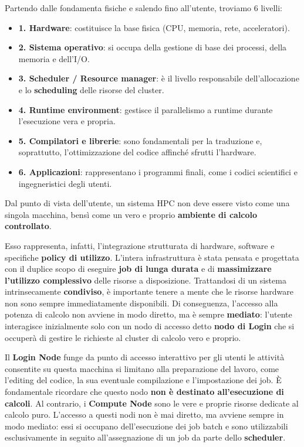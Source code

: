 Partendo dalle fondamenta fisiche e salendo fino all'utente, troviamo 6 livelli:
\begin{itemize}
    \item \textbf{1. Hardware}: costituisce la base fisica (CPU, memoria, rete, acceleratori).
    \item \textbf{2. Sistema operativo}: si occupa della gestione di base dei processi, della memoria e dell'I/O.
    \item \textbf{3. Scheduler / Resource manager}: è il livello responsabile dell'allocazione e lo \textbf{scheduling} delle risorse del cluster.
    \item \textbf{4. Runtime environment}: gestisce il parallelismo a runtime durante l'esecuzione vera e propria.
    \item \textbf{5. Compilatori e librerie}: sono fondamentali per la traduzione e, soprattutto, l'ottimizzazione del codice affinché sfrutti l'hardware.
    \item \textbf{6. Applicazioni}: rappresentano i programmi finali, come i codici scientifici e ingegneristici degli utenti.
\end{itemize}

Dal punto di vista dell'utente, un sistema HPC non deve essere visto come una singola macchina, bensì come un vero e proprio \textbf{ambiente di calcolo controllato}.

Esso rappresenta, infatti, l'integrazione strutturata di hardware, software e specifiche \textbf{policy di utilizzo}. L'intera infrastruttura è stata pensata e progettata con il duplice scopo di eseguire \textbf{job di lunga durata} e di \textbf{massimizzare l'utilizzo complessivo} delle risorse a disposizione. 
Trattandosi di un sistema intrinsecamente \textbf{condiviso}, è importante tenere a mente che le risorse hardware non sono sempre immediatamente disponibili. Di conseguenza, l'accesso alla potenza di calcolo non avviene in modo diretto, ma è sempre \textbf{mediato}: l'utente interagisce inizialmente solo con un nodo di accesso detto \textbf{nodo di Login} che si occuperà di gestire le richieste al cluster di calcolo vero e proprio.

Il \textbf{Login Node} funge da punto di accesso interattivo per gli utenti le attività consentite su questa macchina si limitano alla preparazione del lavoro, come l'editing del codice, la sua eventuale compilazione e l'impostazione dei job. È fondamentale ricordare che questo nodo \textbf{non è destinato all'esecuzione di calcoli}. Al contrario, i \textbf{Compute Node} sono le vere e proprie risorse dedicate al calcolo puro. L'accesso a questi nodi non è mai diretto, ma avviene sempre in modo mediato: essi si occupano dell'esecuzione dei job batch e sono utilizzabili esclusivamente in seguito all'assegnazione di un job da parte dello \textbf{scheduler}. 

